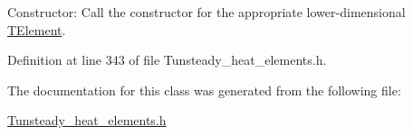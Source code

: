 Constructor\+: Call the constructor for the appropriate lower-\/dimensional \hyperlink{classoomph_1_1TElement}{T\+Element}. 



Definition at line 343 of file Tunsteady\+\_\+heat\+\_\+elements.\+h.



The documentation for this class was generated from the following file\+:\begin{DoxyCompactItemize}
\item 
\hyperlink{Tunsteady__heat__elements_8h}{Tunsteady\+\_\+heat\+\_\+elements.\+h}\end{DoxyCompactItemize}
